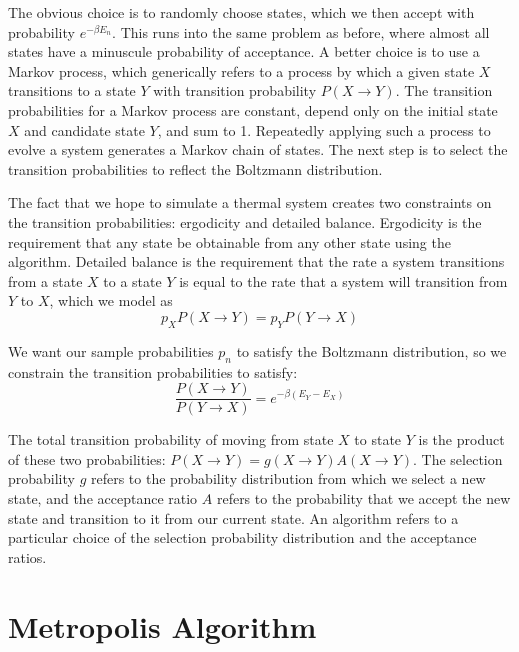 \documentclass[twocolumn,aps,prl]{revtex4-1} %
\begin{document}
The obvious choice is to randomly choose states, which we then accept with probability $e^{-\beta E_n}$. This runs into the same problem as before, where almost all states have a minuscule probability of acceptance. A better choice is to use a Markov process, which generically refers to a process by which a given state $X$ transitions to a state $Y$ with transition probability $P(X \to Y)$. The transition probabilities for a Markov process are constant, depend only on the initial state $X$ and candidate state $Y$, and sum to 1. Repeatedly applying such a process to evolve a system generates a Markov chain of states. The next step is to select the transition probabilities to reflect the Boltzmann distribution.

The fact that we hope to simulate a thermal system creates two constraints on the transition probabilities: ergodicity and detailed balance. Ergodicity is the requirement that any state be obtainable from any other state using the algorithm. Detailed balance is the requirement that the rate a system transitions from a state $X$ to a state $Y$ is equal to the rate that a system will transition from $Y$ to $X$, which we model as 
\begin{equation}
	p_XP(X \to Y) = p_YP(Y \to X)
\end{equation}

We want our sample probabilities $p_n$ to satisfy the Boltzmann distribution, so we constrain the transition probabilities to satisfy:
\begin{equation}
\frac{P(X \to Y)}{P(Y \to X)} = e^{-\beta(E_Y - E_X)}
\end{equation}

The total transition probability of moving from state $X$ to state $Y$ is the product of these two probabilities: $P(X \to Y) = g(X \to Y)A(X \to Y)$. The selection probability  $g$ refers to the probability distribution from which we select a new state, and the acceptance ratio $A$ refers to the probability that we accept the new state and transition to it from our current state. An algorithm refers to a particular choice of the selection probability distribution and the acceptance ratios.


\section{Metropolis Algorithm}
\end{document}
